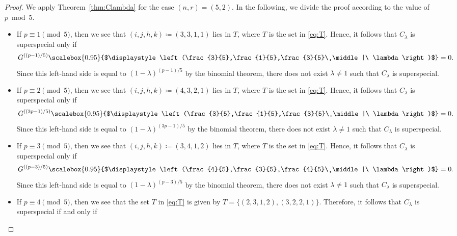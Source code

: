 \documentclass{article}
\theoremstyle{definition}
\begin{document}
\begin{proof}
We apply \hspace{-0.1mm}Theorem~\ref{thm:Clambda} for the case $(n,r) = (5,2)$.
In the following, we divide the proof according to the value of $p \bmod{5}$.\vspace{-1.1mm}
\begin{itemize}
\item If $p \equiv 1 \pmod{5}$, then we see that $(i,j,h,k) \coloneqq (3,3,1,1)$ lies in $T$, where $T$ is the set in \eqref{eq:T}.
Hence, it follows that $C_\lambda$ is superspecial only if\vspace{-1.5mm}
\[
    G^{((p-1)/5)}\scalebox{0.95}{$\displaystyle\left(\frac{3}{5},\frac{1}{5},\frac{3}{5}\ \middle|\ \lambda\right)$} = 0.\vspace{-0.6mm}
\]
Since this left-hand side is equal to $(1-\lambda)^{(p-1)/5}$ by the binomial theorem, there does not exist $\lambda \neq 1$ such that $C_\lambda$ is superspecial.\vspace{-1.5mm}
\item If $p \equiv 2 \pmod{5}$, then we see that $(i,j,h,k) \coloneqq (4,3,2,1)$ lies in $T$, where $T$ is the set in \eqref{eq:T}.
Hence, it follows that $C_\lambda$ is superspecial only if\vspace{-1.5mm}
\[
    G^{((3p-1)/5)}\scalebox{0.95}{$\displaystyle\left(\frac{3}{5},\frac{1}{5},\frac{3}{5}\ \middle|\ \lambda\right)$} = 0.\vspace{-0.6mm}
\]
Since this left-hand side is equal to $(1-\lambda)^{(3p-1)/5}$ by the binomial theorem, there does not exist $\lambda \neq 1$ such that $C_\lambda$ is superspecial.\vspace{-1.5mm}
\item If $p \equiv 3 \pmod{5}$, then we see that $(i,j,h,k) \coloneqq (3,4,1,2)$ lies in $T$, where $T$ is the set in \eqref{eq:T}.
Hence, it follows that $C_\lambda$ is superspecial only if\vspace{-1.5mm}
\[
    G^{((p-3)/5)}\scalebox{0.95}{$\displaystyle\left(\frac{4}{5},\frac{3}{5},\frac{4}{5}\ \middle|\ \lambda\right)$} = 0.\vspace{-0.6mm}
\]
Since this left-hand side is equal to $(1-\lambda)^{(p-3)/5}$ by the binomial theorem, there does not exist $\lambda \neq 1$ such that $C_\lambda$ is superspecial.\vspace{-1.5mm}
\item If $p \equiv 4 \pmod{5}$, then we see that the set $T$ in \eqref{eq:T} is given by $T = \{(2,3,1,2),(3,2,2,1)\}$.
Therefore, it follows that $C_\lambda$ is superspecial if and only if\vspace{-1mm}

\end{itemize}
\end{proof}
\end{document}
